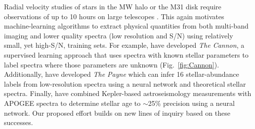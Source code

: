 \documentclass[oneside,11pt]{amsart}
\begin{document}
Radial velocity studies of stars in the MW halo or the M31 disk require
observations of up to 10 hours on large telescopes
\citep[e.g.,][]{2018arXiv180904082C}.  This again motivates
machine-learning algorithms to extract physical quantities from both
multi-band imaging and lower quality spectra (low resolution and S/N)
using relatively small, yet high-S/N, training sets.  For example,
\citet{2015ApJ...808...16N} have developed {\it The Cannon}, a
supervised learning approach that uses spectra with known stellar
parameters to label spectra where those parameters are unknown
(Fig.~\ref{fig:Cannon}).  Additionally, \citet{2018arXiv180401530T} have
developed {\it The Payne} which can infer 16 stellar-abundance labels
from low-resolution spectra using a neural network and theoretical
stellar spectra.  Finally, \citet{2018arXiv180803278T} have combined
Kepler-based astroseismology measurements with APOGEE spectra to
determine stellar age to $\sim$25\% precision using a neural network.
Our proposed effort builds on new lines of inquiry based on these
successes.
\end{document}
